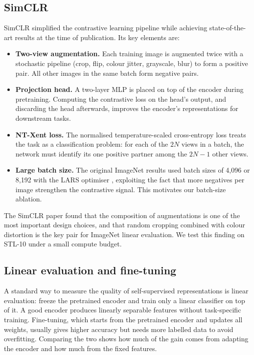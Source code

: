 \documentclass[11pt,a4paper]{article}
\begin{document}
\subsection{SimCLR}
SimCLR \citep{chen2020} simplified the contrastive learning pipeline while achieving state-of-the-art results
at the time of publication. Its key elements are:
\begin{itemize}
  \item \textbf{Two-view augmentation.} Each training image is augmented twice with a stochastic pipeline
  (crop, flip, colour jitter, grayscale, blur) to form a positive pair. All other images in the same batch
  form negative pairs.
  \item \textbf{Projection head.} A two-layer MLP is placed on top of the encoder during pretraining. Computing
  the contrastive loss on the head's output, and discarding the head afterwards, improves the encoder's
  representations for downstream tasks.
  \item \textbf{NT-Xent loss.} The normalised temperature-scaled cross-entropy loss treats the task as a
  classification problem: for each of the $2N$ views in a batch, the network must identify its one positive
  partner among the $2N-1$ other views.
  \item \textbf{Large batch size.} The original ImageNet results used batch sizes of 4,096 or 8,192 with the
  LARS optimiser \citep{you2017}, exploiting the fact that more negatives per image strengthen the contrastive
  signal. This motivates our batch-size ablation.
\end{itemize}
The SimCLR paper found that the composition of augmentations is one of the most important design choices,
and that random cropping combined with colour distortion is the key pair for ImageNet linear evaluation. We
test this finding on STL-10 under a small compute budget.

\subsection{Linear evaluation and fine-tuning}
A standard way to measure the quality of self-supervised representations is linear evaluation: freeze the
pretrained encoder and train only a linear classifier on top of it. A good encoder produces linearly separable
features without task-specific training. Fine-tuning, which starts from the pretrained encoder and updates all
weights, usually gives higher accuracy but needs more labelled data to avoid overfitting. Comparing the two
shows how much of the gain comes from adapting the encoder and how much from the fixed features.
\end{document}
